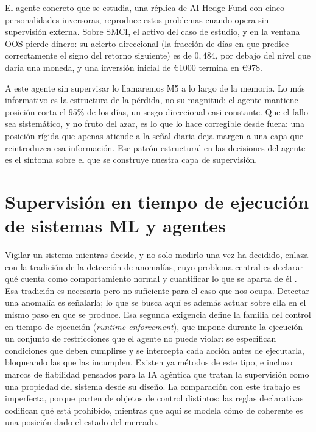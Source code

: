 El agente concreto que se estudia, una réplica de AI Hedge Fund con cinco personalidades inversoras, reproduce estos problemas cuando opera sin supervisión externa. Sobre SMCI, el activo del caso de estudio, y en la ventana OOS pierde dinero: su acierto direccional (la fracción de días en que predice correctamente el signo del retorno siguiente) es de $0{,}484$, por debajo del nivel que daría una moneda, y una inversión inicial de \euro{}1000 termina en \euro{}978.\,%

A este agente sin supervisar lo llamaremos M5 a lo largo de la memoria. Lo más informativo es la estructura de la pérdida, no su magnitud: el agente mantiene posición corta el $95\%$ de los días, un sesgo direccional casi constante. Que el fallo sea sistemático, y no fruto del azar, es lo que lo hace corregible desde fuera: una posición rígida que apenas atiende a la señal diaria deja margen a una capa que reintroduzca esa información. Ese patrón estructural en las decisiones del agente es el síntoma sobre el que se construye nuestra capa de supervisión.

\section{Supervisión en tiempo de ejecución de sistemas ML y agentes}
\label{sec:supervision}

Vigilar un sistema mientras decide, y no solo medirlo una vez ha decidido, enlaza con la tradición de la detección de anomalías, cuyo problema central es declarar qué cuenta como comportamiento normal y cuantificar lo que se aparta de él \cite{chandola2009anomaly}. Esa tradición es necesaria pero no suficiente para el caso que nos ocupa. Detectar una anomalía es señalarla; lo que se busca aquí es además actuar sobre ella en el mismo paso en que se produce. Esa segunda exigencia define la familia del control en tiempo de ejecución (\emph{runtime enforcement}), que impone durante la ejecución un conjunto de restricciones que el agente no puede violar: se especifican condiciones que deben cumplirse y se intercepta cada acción antes de ejecutarla, bloqueando las que las incumplen. Existen ya métodos de este tipo, e incluso marcos de fiabilidad pensados para la IA agéntica que tratan la supervisión como una propiedad del sistema desde su diseño. La comparación con este trabajo es imperfecta, porque parten de objetos de control distintos: las reglas declarativas codifican qué está prohibido, mientras que aquí se modela cómo de coherente es una posición dado el estado del mercado.

